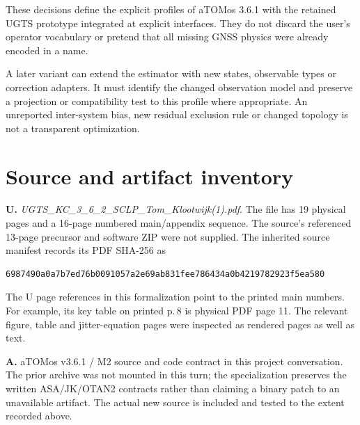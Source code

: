 \documentclass[11pt,a4paper]{article}
\begin{document}
These decisions define the explicit profiles of aTOMos 3.6.1 with the retained UGTS
prototype integrated at explicit interfaces. They do not discard the user's operator
vocabulary or pretend that all missing GNSS physics were already encoded in a name.

A later variant can extend the estimator with new states, observable types or correction
adapters. It must identify the changed observation model and preserve a projection or
compatibility test to this profile where appropriate. An unreported inter-system bias,
new residual exclusion rule or changed topology is not a transparent optimization.
\clearpage

\section{Source and artifact inventory}
\textbf{U.} \emph{UGTS\_KC\_3\_6\_2\_SCLP\_Tom\_Klootwijk(1).pdf}. The file has
19 physical pages and a 16-page numbered main/appendix sequence. The source's referenced
13-page precursor and software ZIP were not supplied. The inherited source manifest records its PDF SHA-256 as
\begin{lstlisting}
6987490a0a7b7ed76b0091057a2e69ab831fee786434a0b4219782923f5ea580
\end{lstlisting}
The U page references in this formalization point to the printed main numbers. For
example, its key table on printed p.\,8 is physical PDF page 11. The relevant figure,
table and jitter-equation pages were inspected as rendered pages as well as text.

\textbf{A.} aTOMos v3.6.1 / M2 source and code contract in this project conversation.
The prior archive was not mounted in this turn; the specialization preserves the
written ASA/JK/OTAN2 contracts rather than claiming a binary patch to an unavailable
artifact. The actual new source is included and tested to the extent recorded above.
\end{document}
